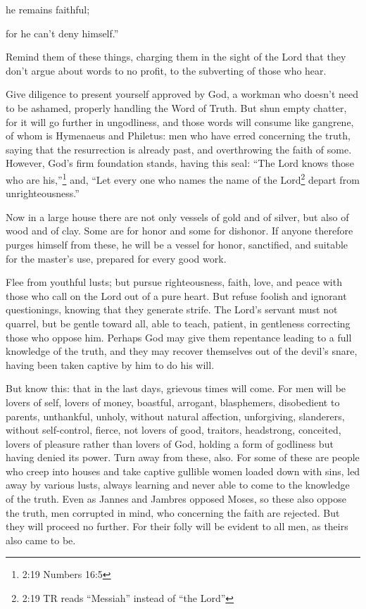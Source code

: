 he remains faithful;

for he can’t deny himself.”


\myverse{}Remind them of these things, charging them in the sight of the Lord that they don’t argue about words to no profit, to the subverting of those who hear.


\myverse{}Give diligence to present yourself approved by God, a workman who doesn’t need to be ashamed, properly handling the Word of Truth. \myverse{}But shun empty chatter, for it will go further in ungodliness, \myverse{}and those words will consume like gangrene, of whom is Hymenaeus and Philetus: \myverse{}men who have erred concerning the truth, saying that the resurrection is already past, and overthrowing the faith of some. \myverse{}However, God’s firm foundation stands, having this seal: “The Lord knows those who are his,”\footnote{2:19 Numbers 16:5} and, “Let every one who names the name of the Lord\footnote{2:19 TR reads “Messiah” instead of “the Lord”} depart from unrighteousness.”


\myverse{}Now in a large house there are not only vessels of gold and of silver, but also of wood and of clay. Some are for honor and some for dishonor. \myverse{}If anyone therefore purges himself from these, he will be a vessel for honor, sanctified, and suitable for the master’s use, prepared for every good work.


\myverse{}Flee from youthful lusts; but pursue righteousness, faith, love, and peace with those who call on the Lord out of a pure heart. \myverse{}But refuse foolish and ignorant questionings, knowing that they generate strife. \myverse{}The Lord’s servant must not quarrel, but be gentle toward all, able to teach, patient, \myverse{}in gentleness correcting those who oppose him. Perhaps God may give them repentance leading to a full knowledge of the truth, \myverse{}and they may recover themselves out of the devil’s snare, having been taken captive by him to do his will.


\mychapter{} \myverse*{}But know this: that in the last days, grievous times will come. \myverse{}For men will be lovers of self, lovers of money, boastful, arrogant, blasphemers, disobedient to parents, unthankful, unholy, \myverse{}without natural affection, unforgiving, slanderers, without self-control, fierce, not lovers of good, \myverse{}traitors, headstrong, conceited, lovers of pleasure rather than lovers of God, \myverse{}holding a form of godliness but having denied its power. Turn away from these, also. \myverse{}For some of these are people who creep into houses and take captive gullible women loaded down with sins, led away by various lusts, \myverse{}always learning and never able to come to the knowledge of the truth. \myverse{}Even as Jannes and Jambres opposed Moses, so these also oppose the truth, men corrupted in mind, who concerning the faith are rejected. \myverse{}But they will proceed no further. For their folly will be evident to all men,
as theirs also came to be.


